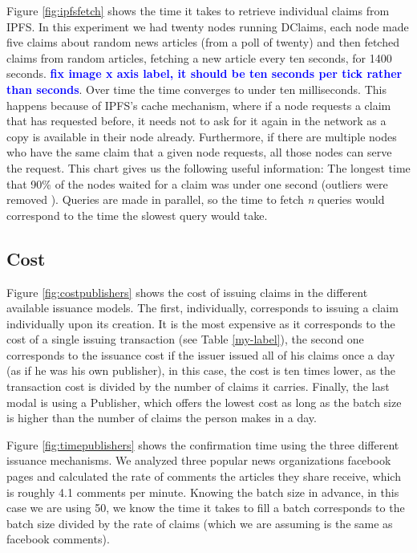 \documentclass[letterpaper,twocolumn,10pt]{article}
\newcommand{\mypara}[1]{\vspace{5pt}\noindent{\bf {#1}}}
\newcommand{\note}[1]{\textcolor{blue}{\bf #1}}
\begin{document}
Figure \ref{fig:ipfsfetch} shows the time it takes to retrieve individual claims from IPFS. In this experiment we had twenty nodes running DClaims, each node made five claims about random news articles (from a poll of twenty) and then fetched claims from random articles, fetching a new article every ten seconds, for 1400 seconds. \note{fix image x axis label, it should be ten seconds per tick rather than seconds}. Over time the time converges to under ten milliseconds. This happens because of IPFS's cache mechanism, where if a node requests a claim that has requested before, it needs not to ask for it again in the network as a copy is available in their node already. Furthermore, if there are multiple nodes who have the same claim that a given node requests, all those nodes can serve the request.
This chart gives us the following useful information: The longest time that 90\% of the nodes waited for a claim was under one second (outliers were removed ).
Queries are made in parallel, so the time to fetch \textit{n} queries would correspond to the time the slowest query would take.



\subsection{Cost}
Figure \ref{fig:costpublishers} shows the cost of issuing claims in the different available issuance models. The first, individually, corresponds to issuing a claim individually upon its creation. It is the most expensive as it corresponds to the cost of a single issuing transaction (see Table \ref{my-label}), the second one corresponds to the issuance cost if the issuer issued all of his claims once a day (as if he was his own publisher), in this case, the cost is ten times lower, as the transaction cost is divided by the number of claims it carries. Finally, the last modal is using a Publisher, which offers the lowest cost as long as the batch size is higher than the number of claims the person makes in a day.

Figure \ref{fig:timepublishers} shows the confirmation time using the three different issuance mechanisms.
\mypara{Q: How do we know the time it takes with publishers?}
We analyzed three popular news organizations facebook pages and calculated the rate of comments the articles they share receive, which is roughly 4.1 comments per minute. Knowing the batch size in advance, in this case we are using 50, we know the time it takes to fill a batch corresponds to the batch size divided by the rate of claims (which we are assuming is the same as facebook comments).
\end{document}
